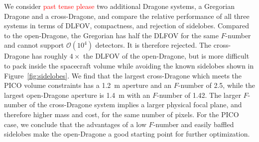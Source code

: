\documentclass[]{spie}  %
\newcommand{\comr}[1]{\textcolor{red}{#1}}
\newcommand{\como}[1]{\textcolor{orange}{#1}}
\begin{document}
We consider \comr{past tense please} two additional Dragone systems, a Gregorian Dragone and a cross-Dragone, and compare the 
relative performance of all three systems in terms of DLFOV, compactness, and rejection of sidelobes.  
Compared to the open-Dragone, the Gregorian has half the DLFOV for the same $F$-number and cannot  
support $\mathcal{O}(10^4)$ detectors. It is therefore rejected.  
The cross-Dragone has roughly $4\times$ the DLFOV of the open-Dragone, 
but is more difficult to pack inside the spacecraft volume while avoiding the known sidelobes shown in Figure~\ref{fig:sidelobes}.
We find that the largest cross-Dragone which meets the PICO volume constraints has 
a 1.2~m aperture and an $F$-number of 2.5, while the largest open-Dragone aperture is 1.4~m with an $F$-number of 1.42. The larger 
$F$-number of the cross-Dragone system implies a larger physical focal plane, and therefore higher mass and cost, 
for the same number of pixels. 
For the PICO case, we conclude that the advantages of a low $F$-number and easily baffled sidelobes make the open-Dragone a good starting  
point for further optimization. 


\end{document}
